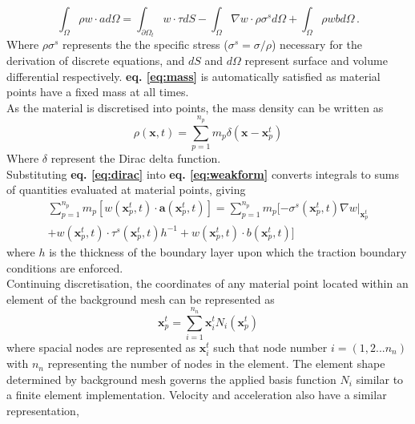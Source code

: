 \begin{equation}
\int_\Omega \rho w \cdot ad\Omega =  \int_{\partial\Omega_t} w\cdot\tau dS - \int_\Omega \nabla w\cdot\rho\sigma^s d\Omega + \int_\Omega \rho w b d\Omega \,.
\label{eq:weakform}
\end{equation}
Where $\rho\sigma^s$ represents the the specific stress ($\sigma^s = \sigma / \rho$) necessary for the derivation of discrete equations, and $dS$ and $d\Omega$ represent surface and volume differential respectively. {\bfseries eq. \ref{eq:mass}} is automatically satisfied as material points have a fixed mass at all times.\\
\newline
\noindent
As the material is discretised into points, the mass density can be written as
\begin{equation}
\rho(\mathbf{x},t) = \sum_{p=1}^{n_p} m_p \delta(\mathbf{x-x}_p^t)
\label{eq:dirac}
\end{equation}
Where $\delta$ represent the Dirac delta function.\\
\newline
\noindent
Substituting {\bfseries eq. \ref{eq:dirac}} into {\bfseries eq. \ref{eq:weakform}} converts integrals to sums of quantities evaluated at material points, giving
\begin{equation}
\begin{aligned}
\sum_{p=1}^{n_p} m_p [w(\mathbf{x}_p^t,t)\cdot \mathbf{a}(\mathbf{x}_p^t,t)] = \sum_{p=1}^{n_p} m_p [-\sigma^s (\mathbf{x}_p^t,t)\nabla w \rvert_{\mathbf{x}_p^t}\\  + w(\mathbf{x}_p^t,t) \cdot \tau^s(\mathbf{x}_p^t,t)h^{-1} + w(\mathbf{x}_p^t,t) \cdot b(\mathbf{x}_p^t,t)]
\label{eq:sum1}
\end{aligned}
\end{equation}
where $h$ is the thickness of the boundary layer upon which the traction boundary conditions are enforced.\\
\newline
\noindent
Continuing discretisation, the coordinates of any material point located within an element of the background mesh can be represented as
\begin{equation}
\mathbf{x}_p^t = \sum_{i=1}^{n_n} \mathbf{x}_i^t N_i(\mathbf{x}_p^t)
\label{eq:shapefunction}
\end{equation}
where spacial nodes are represented as $\mathbf{x}_i^t$ such that node number $i = (1,2...n_n)$ with $n_n$ representing the number of nodes in the element. The element shape determined by background mesh governs the applied basis function $N_i$ similar to a finite element implementation. Velocity and acceleration also have a similar representation,

